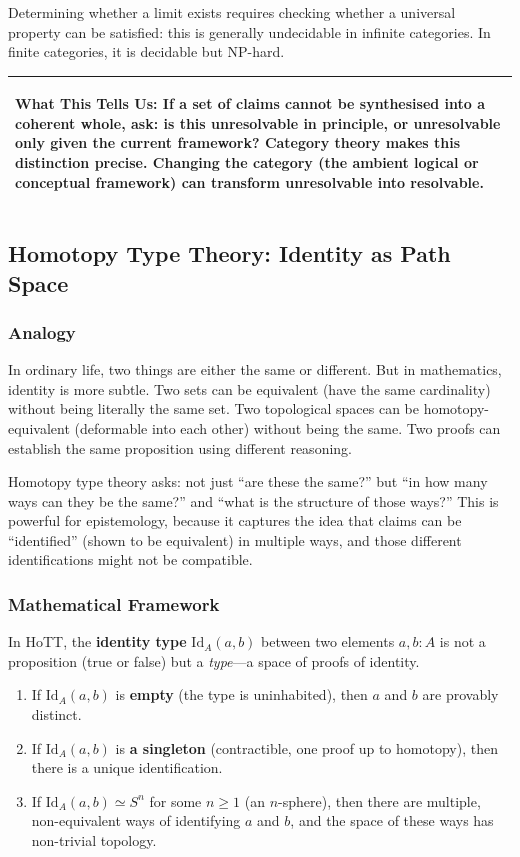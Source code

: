 \documentclass[11pt,letterpaper]{article}
\theoremstyle{definition}
\theoremstyle{remark}
\newenvironment{insightbox}{%
  \vspace{0.3cm}%
  \noindent\begin{tabular}{|p{\dimexpr\textwidth-4\tabcolsep-2\arrayrulewidth}|}
  \hline
  \small\itshape\color{accent}
}{%
  \\ \hline
  \end{tabular}
  \vspace{0.3cm}
}
\begin{document}
Determining whether a limit exists requires checking whether a universal property can be satisfied: this is generally undecidable in infinite categories. In finite categories, it is decidable but NP-hard.

\begin{insightbox}
\textbf{What This Tells Us:} If a set of claims cannot be synthesised into a coherent whole, ask: is this unresolvable in principle, or unresolvable only given the current framework? Category theory makes this distinction precise. Changing the category (the ambient logical or conceptual framework) can transform unresolvable into resolvable.
\end{insightbox}

\subsection{Homotopy Type Theory: Identity as Path Space}
\label{sec:hott}

\subsubsection*{Analogy}

In ordinary life, two things are either the same or different. But in mathematics, identity is more subtle. Two sets can be equivalent (have the same cardinality) without being literally the same set. Two topological spaces can be homotopy-equivalent (deformable into each other) without being the same. Two proofs can establish the same proposition using different reasoning.

Homotopy type theory asks: not just ``are these the same?'' but ``in how many ways can they be the same?'' and ``what is the structure of those ways?'' This is powerful for epistemology, because it captures the idea that claims can be ``identified'' (shown to be equivalent) in multiple ways, and those different identifications might not be compatible.

\subsubsection*{Mathematical Framework}

In HoTT, the \textbf{identity type} $\mathrm{Id}_A(a, b)$ between two elements $a, b : A$ is not a proposition (true or false) but a \emph{type}---a space of proofs of identity.

\begin{enumerate}
\item If $\mathrm{Id}_A(a, b)$ is \textbf{empty} (the type is uninhabited), then $a$ and $b$ are provably distinct.
\item If $\mathrm{Id}_A(a, b)$ is \textbf{a singleton} (contractible, one proof up to homotopy), then there is a unique identification.
\item If $\mathrm{Id}_A(a, b) \simeq S^n$ for some $n \geq 1$ (an $n$-sphere), then there are multiple, non-equivalent ways of identifying $a$ and $b$, and the space of these ways has non-trivial topology.
\end{enumerate}
\end{document}

